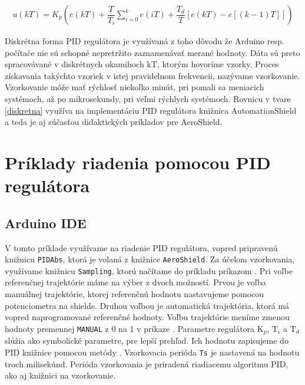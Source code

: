 \begin{align}
	\label{diskretna}
	u(kT)=K_p \left(e(kT) + \dfrac{T}{T_i} \sum_{i=0}^{k}  e(iT) + \dfrac{T_d}{T} \left[e(kT)-e \left[(k - 1)T\right] \right] \right)
\end{align}

Diskrétna forma PID regulátora je využívaná z toho dôvodu že Arduino resp. počítače nie sú schopné nepretržito zaznamenávať merané hodnoty. Dáta sú preto spracovávané v diskrétnych okamihoch kT, ktorým hovoríme vzorky. Proces získavania takýchto vzoriek v istej pravidelnom frekvencii, nazývame vzorkovanie. Vzorkovanie môže mať rýchlosť niekoľko minút, pri pomali sa meniacich systémoch, až po mikrosekundy, pri veľmi rýchlych systémoch. Rovnicu v tvare \ref{diskretna} využíva na implementáciu PID regulátora knižnica AutomationShield a teda je aj súčasťou didaktických príkladov pre AeroShield. 

\section{Príklady riadenia pomocou PID regulátora}
\subsection{Arduino IDE}
\label{Arduino IDE PID}

V tomto príklade využívame na riadenie PID regulátora, vopred pripravenú knižnicu \verb|PIDAbs|, ktorá je volaná z knižnice \verb|AeroShield|. Za účelom vzorkovania, využívame knižnicu \verb|Sampling|, ktorú načítame do príkladu príkazom . Pri voľbe referenčnej trajektórie máme na výber z dvoch možností. Prvou je voľba manuálnej trajektórie, ktorej referenčnú hodnotu nastavujeme pomocou potenciometra na shielde. Druhou voľbou je automatická trajektória, ktorá má vopred naprogramované referenčné hodnoty. Voľbu trajektórie meníme zmenou hodnoty premennej \verb|MANUAL| z 0 na 1 v príkaze . Parametre regulátora K$_p$, T$_i$ a T$_d$ slúžia ako symbolické parametre, pre lepší prehľad. Ich hodnotu zapisujeme do PID knižnice pomocou metódy . Vzorkovacia perióda \verb|Ts| je nastavená na hodnotu troch milisekúnd. Perióda vzorkovania je priradená riadiacemu algoritmu PID, ako aj knižnici na vzorkovanie. 

